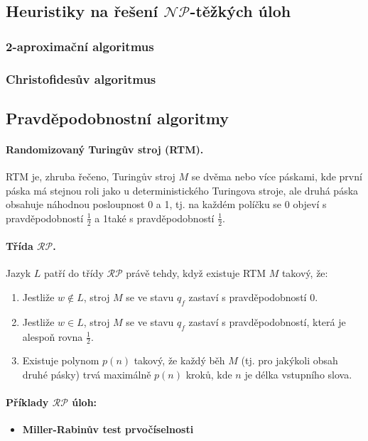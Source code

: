 \subsection*{Heuristiky na řešení $\mathcal{NP}$-těžkých úloh}

\subsubsection*{2-aproximační algoritmus}

\subsubsection*{Christofidesův algoritmus}

\subsection*{Pravděpodobnostní algoritmy}

\paragraph{Randomizovaný Turingův stroj (RTM).} RTM je, zhruba řečeno, Turingův stroj $M$ se dvěma nebo více páskami, kde první páska má stejnou roli jako u deterministického Turingova stroje, ale druhá páska obsahuje náhodnou posloupnost 0 a 1, tj. na každém políčku se 0 objeví s pravděpodobností $\frac{1}{2}$ a 1také s pravděpodobností $\frac{1}{2}$.

\paragraph{Třída $\mathcal{RP}$.} Jazyk $L$ patří do třídy $\mathcal{RP}$ právě tehdy, když existuje RTM $M$ takový, že:

\begin{enumerate}
    \item Jestliže $w \notin L$, stroj $M$ se ve stavu $q_f$ zastaví s pravděpodobností 0.
    \item Jestliže $w \in L$, stroj $M$ se ve stavu $q_f$ zastaví s pravděpodobností, která je alespoň rovna $\frac{1}{2}$.
    \item Existuje polynom $p(n)$ takový, že každý běh $M$ (tj. pro jakýkoli obsah druhé pásky) trvá maximálně $p(n)$ kroků, kde $n$ je délka vstupního slova.
\end{enumerate}

\paragraph{Příklady $\mathcal{RP}$ úloh:}
\begin{itemize}[itemsep=0pt]
    \item \textbf{\color{darkBrown}Miller-Rabinův test prvočíselnosti}
\end{itemize}

